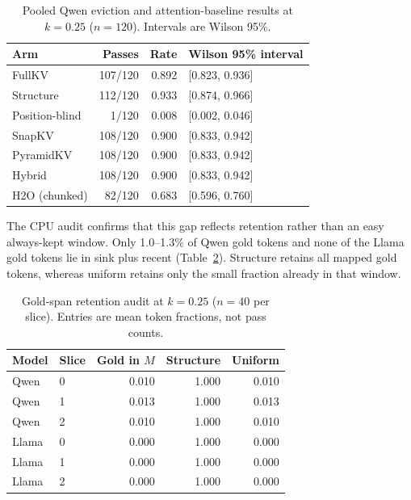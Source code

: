 \begin{table}[!htbp]
  \centering
  \caption{Pooled Qwen eviction and attention-baseline results at $k=0.25$
  ($n=120$).  Intervals are Wilson 95\%.}
  \label{tab:qwen-main}
  \begin{tabular}{lrrl}
    \toprule
    Arm & Passes & Rate & Wilson 95\% interval \\
    \midrule
    FullKV & 107/120 & 0.892 & [0.823, 0.936] \\
    Structure & 112/120 & 0.933 & [0.874, 0.966] \\
    Position-blind & 1/120 & 0.008 & [0.002, 0.046] \\
    \midrule
    SnapKV & 108/120 & 0.900 & [0.833, 0.942] \\
    PyramidKV & 108/120 & 0.900 & [0.833, 0.942] \\
    Hybrid & 108/120 & 0.900 & [0.833, 0.942] \\
    H2O (chunked) & 82/120 & 0.683 & [0.596, 0.760] \\
    \bottomrule
  \end{tabular}

\end{table}

The CPU audit confirms that this gap reflects retention rather than an easy
always-kept window.  Only 1.0--1.3\% of Qwen gold tokens and none of the Llama
gold tokens lie in sink plus recent (Table~\ref{tab:audit}).  Structure retains
all mapped gold tokens, whereas uniform retains only the small fraction already
in that window.

\begin{table}[!htbp]
  \centering
  \caption{Gold-span retention audit at $k=0.25$ ($n=40$ per slice).  Entries
  are mean token fractions, not pass counts.}
  \label{tab:audit}
  \begin{tabular}{llrrr}
    \toprule
    Model & Slice & Gold in $M$ & Structure & Uniform \\
    \midrule
    Qwen & 0 & 0.010 & 1.000 & 0.010 \\
    Qwen & 1 & 0.013 & 1.000 & 0.013 \\
    Qwen & 2 & 0.010 & 1.000 & 0.010 \\
    Llama & 0 & 0.000 & 1.000 & 0.000 \\
    Llama & 1 & 0.000 & 1.000 & 0.000 \\
    Llama & 2 & 0.000 & 1.000 & 0.000 \\
    \bottomrule
  \end{tabular}
\end{table}

